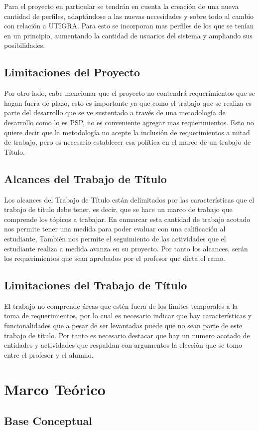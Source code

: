 \documentclass[a4paper,12pt,openany,oneside]{book}
\begin{document}
Para el proyecto en particular se tendrán en cuenta la creación de una nueva cantidad de perfiles, adaptándose a las nuevas necesidades y sobre todo al cambio con relación a UTIGRA. Para esto se incorporan mas perfiles de los que se tenían en un principio, aumentando la cantidad de usuarios del sistema y ampliando sus posibilidades.
\section{Limitaciones del Proyecto}
Por otro lado, cabe mencionar que el proyecto no contendrá requerimientos que se hagan fuera de plazo, esto es importante ya que como el trabajo que se realiza es parte del desarrollo que se ve sustentado a través de una metodología de desarrollo como lo es PSP, no es conveniente agregar mas requerimientos. Esto no quiere decir que la metodología no acepte la inclusión de requerimientos a mitad de trabajo, pero es necesario establecer esa política en el marco de un trabajo de Título.
\section{Alcances del Trabajo de Título}
Los alcances del Trabajo de Título están delimitados por las características que el trabajo de título debe tener, es decir, que se hace un marco de trabajo que comprende los tópicos a trabajar. En enmarcar esta cantidad de trabajo acotado nos permite tener una medida para poder evaluar con una calificación al estudiante, También nos permite el seguimiento de las actividades que el estudiante realiza a medida avanza en su proyecto. Por tanto los alcances, serán los requerimientos que sean aprobados por el profesor que dicta el ramo.
\section{Limitaciones del Trabajo de Título}
El trabajo no comprende áreas que estén fuera de los limites temporales a la toma de requerimientos, por lo cual es necesario indicar que hay características y funcionalidades que a pesar de ser levantadas puede que no sean parte de este trabajo de título. Por tanto es necesario destacar que hay un numero acotado de entidades y actividades que respaldan con argumentos la elección que se tomo entre el profesor y el alumno.
\chapter{Marco Teórico}
\thispagestyle{empty}
\section{Base Conceptual}
\end{document}
